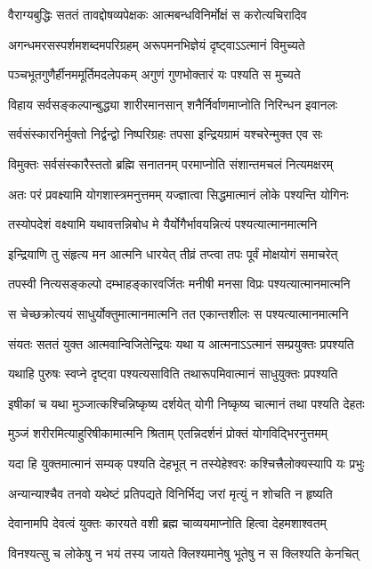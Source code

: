 \twolineshloka
{वैराग्यबुद्धिः सततं तावद्दोषव्यपेक्षकः}
{आत्मबन्धविनिर्मोक्षं स करोत्यचिरादिव}


\twolineshloka
{अगन्धमरसस्पर्शमशब्दमपरिग्रहम्}
{अरूपमनभिज्ञेयं दृष्ट्वाऽऽत्मानं विमुच्यते}


\twolineshloka
{पञ्चभूतगुणैर्हीनममूर्तिमदलेपकम्}
{अगुणं गुणभोक्तारं यः पश्यति स मुच्यते}


\twolineshloka
{विहाय सर्वसङ्कल्पान्बुद्ध्या शारीरमानसान्}
{शनैर्निर्वाणमाप्नोति निरिन्धन इवानलः}


\twolineshloka
{सर्वसंस्कारनिर्मुक्तो निर्द्वन्द्वो निष्परिग्रहः}
{तपसा इन्द्रियग्रामं यश्चरेन्मुक्त एव सः}


\twolineshloka
{विमुक्तः सर्वसंस्कारैस्ततो ब्रह्मि सनातनम्}
{परमाप्नोति संशान्तमचलं नित्यमक्षरम्}


\twolineshloka
{अतः परं प्रवक्ष्यामि योगशास्त्रमनुत्तमम्}
{यज्ज्ञात्वा सिद्धमात्मानं लोके पश्यन्ति योगिनः}


\twolineshloka
{तस्योपदेशं वक्ष्यामि यथावत्तन्निबोध मे}
{यैर्योगैर्भावयन्नित्यं पश्यत्यात्मानमात्मनि}


\twolineshloka
{इन्द्रियाणि तु संहृत्य मन आत्मनि धारयेत्}
{तीव्रं तप्त्वा तपः पूर्वं मोक्षयोगं समाचरेत्}


\twolineshloka
{तपस्वी नित्यसङ्कल्पो दम्भाहङ्कारवर्जितः}
{मनीषी मनसा विप्रः पश्यत्यात्मानमात्मनि}


\twolineshloka
{स चेच्छक्रोत्ययं साधुर्योक्तुमात्मानमात्मनि}
{तत एकान्तशीलः स पश्यत्यात्मानमात्मनि}


\twolineshloka
{संयतः सततं युक्त आत्मवान्विजितेन्द्रियः}
{यथा य आत्मनाऽऽत्मानं सम्प्रयुक्तः प्रपश्यति}


\twolineshloka
{यथाहि पुरुषः स्वप्ने दृष्ट्वा पश्यत्यसाविति}
{तथारूपमिवात्मानं साधुयुक्तः प्रपश्यति}


\twolineshloka
{इषीकां च यथा मुञ्जात्कश्चिन्निष्कृष्य दर्शयेत्}
{योगी निष्कृष्य चात्मानं तथा पश्यति देहतः}


\twolineshloka
{मुञ्जं शरीरमित्याहुरिषीकामात्मनि श्रिताम्}
{एतन्निदर्शनं प्रोक्तं योगविद्भिरनुत्तमम्}


\twolineshloka
{यदा हि युक्तमात्मानं सम्यक् पश्यति देहभूत्}
{न तस्येहेश्वरः कश्चित्त्रैलोक्यस्यापि यः प्रभुः}


\twolineshloka
{अन्यान्याश्चैव तनवो यथेष्टं प्रतिपद्यते}
{विनिर्भिद्य जरां मृत्युं न शोचति न हृष्यति}


\twolineshloka
{देवानामपि देवत्वं युक्तः कारयते वशी}
{ब्रह्म चाव्ययमाप्नोति हित्वा देहमशाश्वतम्}


\twolineshloka
{विनश्यत्सु च लोकेषु न भयं तस्य जायते}
{क्लिश्यमानेषु भूतेषु न स क्लिश्यति केनचित्}


